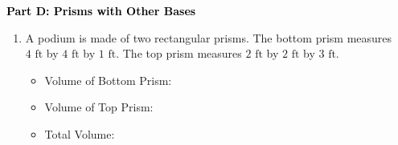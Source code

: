 \documentclass[12pt, letterpaper, fleqn]{article}
\newcommand{\blank}{\underline{\hspace{2.2cm}}}
\begin{document}
\newpage

\begin{tcolorbox}[colback=customteal!20]
\large\textcolor{black}{\textbf{Part D: Prisms with Other Bases}}
\end{tcolorbox}

\vspace{3mm}

\begin{enumerate}[itemsep=4.2cm, leftmargin=0.6cm, resume]
\item A podium is made of two rectangular prisms. The bottom prism measures $4\text{ ft}$ by $4\text{ ft}$ by $1\text{ ft}$. The top prism measures $2\text{ ft}$ by $2\text{ ft}$ by $3\text{ ft}$. 
\begin{itemize}
\item Volume of Bottom Prism: \blank
\item Volume of Top Prism: \blank
\item Total Volume: \blank
\end{itemize}
\end{enumerate}
\end{document}
